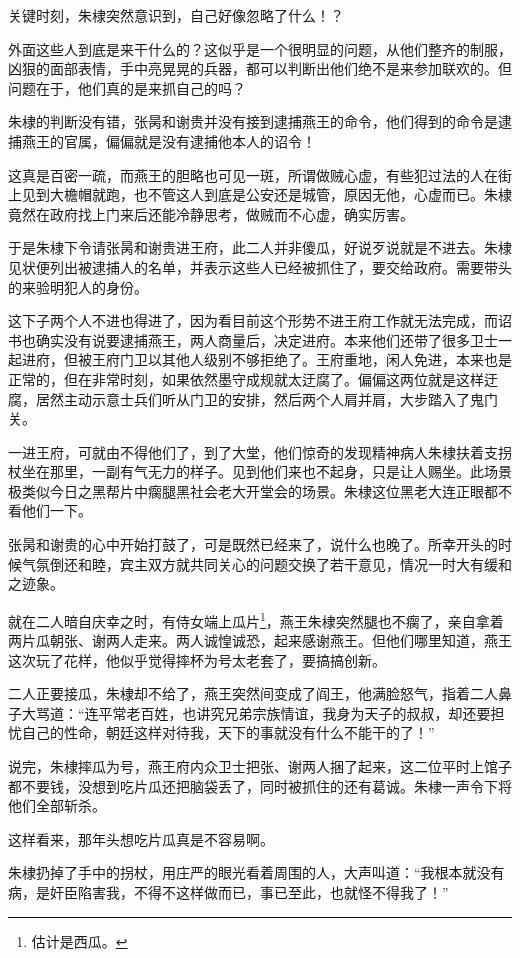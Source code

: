 \begin{multicols}{\theparacolNo}
		关键时刻，朱棣突然意识到，自己好像忽略了什么！？

		外面这些人到底是来干什么的？这似乎是一个很明显的问题，从他们整齐的制服，凶狠的面部表情，手中亮晃晃的兵器，都可以判断出他们绝不是来参加联欢的。但问题在于，他们真的是来抓自己的吗？

		朱棣的判断没有错，张昺和谢贵并没有接到逮捕燕王的命令，他们得到的命令是逮捕燕王的官属，偏偏就是没有逮捕他本人的诏令！

		这真是百密一疏，而燕王的胆略也可见一斑，所谓做贼心虚，有些犯过法的人在街上见到大檐帽就跑，也不管这人到底是公安还是城管，原因无他，心虚而已。朱棣竟然在政府找上门来后还能冷静思考，做贼而不心虚，确实厉害。

		于是朱棣下令请张昺和谢贵进王府，此二人并非傻瓜，好说歹说就是不进去。朱棣见状便列出被逮捕人的名单，并表示这些人已经被抓住了，要交给政府。需要带头的来验明犯人的身份。

		这下子两个人不进也得进了，因为看目前这个形势不进王府工作就无法完成，而诏书也确实没有说要逮捕燕王，两人商量后，决定进府。本来他们还带了很多卫士一起进府，但被王府门卫以其他人级别不够拒绝了。王府重地，闲人免进，本来也是正常的，但在非常时刻，如果依然墨守成规就太迂腐了。偏偏这两位就是这样迂腐，居然主动示意士兵们听从门卫的安排，然后两个人肩并肩，大步踏入了鬼门关。

		一进王府，可就由不得他们了，到了大堂，他们惊奇的发现精神病人朱棣扶着支拐杖坐在那里，一副有气无力的样子。见到他们来也不起身，只是让人赐坐。此场景极类似今日之黑帮片中瘸腿黑社会老大开堂会的场景。朱棣这位黑老大连正眼都不看他们一下。

		张昺和谢贵的心中开始打鼓了，可是既然已经来了，说什么也晚了。所幸开头的时候气氛倒还和睦，宾主双方就共同关心的问题交换了若干意见，情况一时大有缓和之迹象。

		就在二人暗自庆幸之时，有侍女端上瓜片\footnote{估计是西瓜。}，燕王朱棣突然腿也不瘸了，亲自拿着两片瓜朝张、谢两人走来。两人诚惶诚恐，起来感谢燕王。但他们哪里知道，燕王这次玩了花样，他似乎觉得摔杯为号太老套了，要搞搞创新。

		二人正要接瓜，朱棣却不给了，燕王突然间变成了阎王，他满脸怒气，指着二人鼻子大骂道：“连平常老百姓，也讲究兄弟宗族情谊，我身为天子的叔叔，却还要担忧自己的性命，朝廷这样对待我，天下的事就没有什么不能干的了！”

		说完，朱棣摔瓜为号，燕王府内众卫士把张、谢两人捆了起来，这二位平时上馆子都不要钱，没想到吃片瓜还把脑袋丢了，同时被抓住的还有葛诚。朱棣一声令下将他们全部斩杀。

		这样看来，那年头想吃片瓜真是不容易啊。

		朱棣扔掉了手中的拐杖，用庄严的眼光看着周围的人，大声叫道：“我根本就没有病，是奸臣陷害我，不得不这样做而已，事已至此，也就怪不得我了！”
		\ifnum{}
	\end{multicols}
\fi
\newpage

